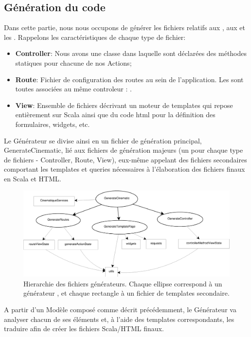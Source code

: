 \subsection{Génération du code}
Dans cette partie, nous nous occupons de générer les fichiers relatifs aux , aux  et les . Rappelons les caractéristiques de chaque type de fichier:
\begin{itemize}
\item \textbf{Controller}: Nous avons une classe  dans laquelle sont déclarées des méthodes statiques pour chacune de nos Actions;
\item \textbf{Route}: Fichier de configuration des routes au sein de l'application. Les  sont toutes associées au même controleur : . 
\item \textbf{View}: Ensemble de fichiers décrivant un moteur de templates qui repose entièrement sur Scala ainsi que du code html pour la définition des formulaires, widgets, etc. 
\end{itemize}
Le Générateur  se divise ainsi en un fichier de génération principal, GenerateCinematic, lié aux fichiers de génération majeurs (un pour chaque type de fichiers - Controller, Route, View), eux-même appelant des fichiers secondaires comportant les templates et queries nécessaires à l'élaboration des fichiers finaux en Scala et HTML.
\begin{figure}[H]
  \centering
  \includegraphics[scale=.35]{img/hierarchie.eps}
  \caption{Hierarchie des fichiers générateurs. Chaque ellipse correspond à un générateur , et chaque rectangle à un fichier de templates secondaire.}
  \label{fig: hierarchie generateurs}
\end{figure}
A partir d'un Modèle composé comme décrit précédemment, le Générateur va analyser chacun de ses éléments et, à l'aide des templates correspondants, les traduire afin de créer les fichiers Scala/HTML finaux. 
